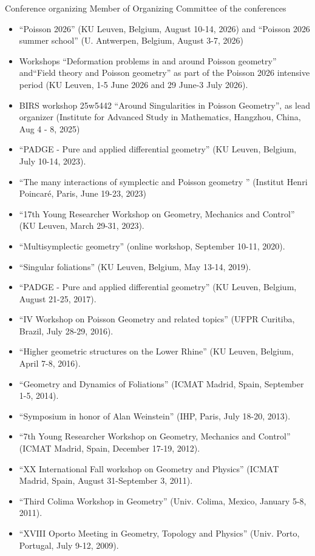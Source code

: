 \documentclass[12p]{resume}
\begin{document}
\begin{category}{Conference organizing}
 \citemnobullet Member of Organizing Committee of the conferences

 \begin{itemize}
 \item ``Poisson 2026'' (KU Leuven, Belgium, August 10-14, 2026) and ``Poisson 2026 summer school'' (U. Antwerpen, Belgium, August 3-7, 2026)
  \item Workshops ``Deformation problems in and around Poisson geometry'' and``Field theory and Poisson geometry'' as part of the Poisson 2026 intensive period (KU Leuven, 1-5 June 2026 and 29 June-3 July 2026).
 \item BIRS workshop 25w5442
``Around Singularities in Poisson Geometry'', as lead organizer (Institute for Advanced Study in Mathematics, Hangzhou, China, Aug 4 - 8, 2025)
 \item  ``PADGE - Pure and applied differential geometry'' (KU Leuven, Belgium, July 10-14, 2023). 
 \item ``The many interactions of symplectic and Poisson geometry ''    (Institut Henri Poincar\'e, Paris, June 19-23, 2023)
 \item  ``17th
Young Researcher Workshop on Geometry, Mechanics and Control'' (KU Leuven, March 29-31, 2023).
 \item  ``Multisymplectic geometry'' (online workshop, September 10-11, 2020).  
 \item  ``Singular foliations'' (KU Leuven, Belgium, May 13-14, 2019). 
 \item  ``PADGE - Pure and applied differential geometry'' (KU Leuven, Belgium, August 21-25, 2017). 
 \item ``IV Workshop on Poisson Geometry and related topics'' (UFPR Curitiba, Brazil, July 28-29, 2016).
\item ``Higher geometric structures on the Lower Rhine'' (KU Leuven, Belgium, April 7-8, 2016). 
\item ``Geometry and Dynamics of Foliations'' (ICMAT Madrid, Spain, September 1-5, 2014).
\item ``Symposium in honor of Alan Weinstein'' (IHP, Paris, July 18-20, 2013).
\item  ``7th
Young Researcher Workshop on Geometry, Mechanics and Control'' (ICMAT Madrid, Spain, December 17-19, 2012).
\item ``XX International Fall workshop on Geometry and Physics'' (ICMAT Madrid, Spain, August 31-September 3,  2011).
\item ``Third Colima Workshop in Geometry'' (Univ. Colima, Mexico, January 5-8, 2011).
\item ``XVIII Oporto Meeting in Geometry, Topology and Physics'' (Univ. Porto, Portugal, July 9-12, 2009).
\end{itemize}
 \end{category}
\end{document}
